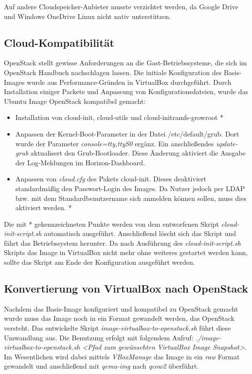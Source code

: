 Auf andere Cloudspeicher-Anbieter musste verzichtet werden, da Google Drive und Windows OneDrive Linux nicht nativ unterstützen.

\subsection{Cloud-Kompatibilität}

OpenStack stellt gewisse Anforderungen an die Gast-Betriebssysteme, die sich im OpenStack Handbuch \cite{osImageRequirement} nachschlagen lassen. 
Die initiale Konfiguration des Basis-Images wurde aus Performance-Gründen in VirtualBox durchgeführt.
Durch Installation einiger Packete und Anpassung von Konfigurationsdateien, wurde das Ubuntu Image OpenStack kompatibel gemacht:

\begin{itemize}
\item Installation von cloud-init, cloud-utils und cloud-initramfs-growroot *
\item Anpassen der Kernel-Boot-Parameter in der Datei /etc/default/grub. Dort wurde der Parameter \emph{console=tty,ttyS0} ergänz. Ein anschließendes \emph{update-grub} aktualisert den Grub-Bootloader. Diese Änderung aktiviert die Ausgabe der Log-Meldungen im Horizon-Dashboard.
\item Anpassen von \emph{cloud.cfg} des Pakets cloud-init. Dieses deaktiviert standardmäßig den Passwort-Login des Images. Da Nutzer jedoch per LDAP bzw. mit dem Standardbenutzername sich anmelden können sollen, muss dies aktiviert werden. *
\end{itemize}

Die mit * gekennzeichneten Punkte werden von dem entworfenen Skript \emph{cloud-init-script.sh} automatisch ausgeführt. 
Anschließend löscht sich das Skript und fährt das Betriebssystem herunter.
Da nach Ausführung des \emph{cloud-init-script.sh} Skripts das Image in VirtualBox nicht mehr ohne weiteres gestartet werden kann, sollte das Skript am Ende der Konfiguration ausgeführt werden.

\subsection{Konvertierung von VirtualBox nach OpenStack}

Nachdem das Basis-Image konfiguriert und kompatibel zu OpenStack gemacht wurde muss das Image noch in ein Format gewandelt werden, das OpenStack versteht.
Das entwickelte Skript \emph{image-virtualbox-to-openstack.sh} führt diese Umwandlung aus. 
Die Benutzung erfolgt mit folgendem Aufruf: \emph{./image-virtualbox-to-openstack.sh <Pfad zum gewünschten VirtualBox Image Snapshot>}.
Im Wesentlichen wird dabei mittels \emph{VBoxManage} das Image in ein \emph{raw} Format gewandelt und anschließend mit \emph{qemu-img} nach \emph{qcow2} überführt.

